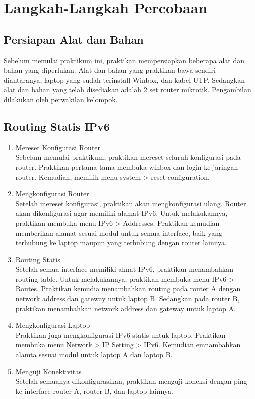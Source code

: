 \section{Langkah-Langkah Percobaan}
\subsection{Persiapan Alat dan Bahan}
Sebelum memulai praktikum ini, praktikan mempersiapkan beberapa alat dan bahan yang diperlukan. Alat dan bahan yang praktikan bawa sendiri diantaranya, laptop yang sudah terinstall Winbox, dan kabel UTP. Sedangkan alat dan bahan yang telah disediakan adalah 2 set router mikrotik. Pengambilan dilakukan oleh perwakilan kelompok.

\subsection{Routing Statis IPv6}
\begin{enumerate}
  \item Mereset Konfigurasi Router \\
  Sebelum memulai praktikum, praktikan mereset seluruh konfigurasi pada router. Praktikan pertama-tama membuka winbox dan login ke jaringan router. Kemudian, memilih menu system > reset configuration.
  \item Mengkonfigurasi Router \\
  Setelah mereset konfigurasi, praktikan akan mengkonfigurasi ulang. Router akan dikonfigurasi agar memiliki alamat IPv6. Untuk melakukannya, praktikan membuka menu IPv6 > Addresses. Praktikan kemudian memberikan alamat sesuai modul untuk semua interface, baik yang terhubung ke laptop maupun yang terhubung dengan router lainnya.
  \item Routing Statis \\
  Setelah semua interface memiliki almat IPv6, praktikan menambahkan routing table. Untuk melakukannya, praktikan membuka menu IPv6 > Routes. Praktikan kemudia menambahkan routing pada router A dengan network address dan gateway untuk laptop B. Sedangkan pada router B, praktikan menambahkan network address dan gateway untuk laptop A.
  \item Mengkonfigurasi Laptop\\
  Praktikan juga mengkonfigurasi IPv6 statis untuk laptop. Praktikan membuka menu Network > IP Setting > IPv6. Kemudian emnambahkan alamta sesuai modul untuk laptop A dan laptop B.
  \item Menguji Konektivitas \\
  Setelah semuanya dikonfigurasikan, praktikan menguji koneksi dengan ping ke interface router A, router B, dan laptop lainnya.
\end{enumerate}

